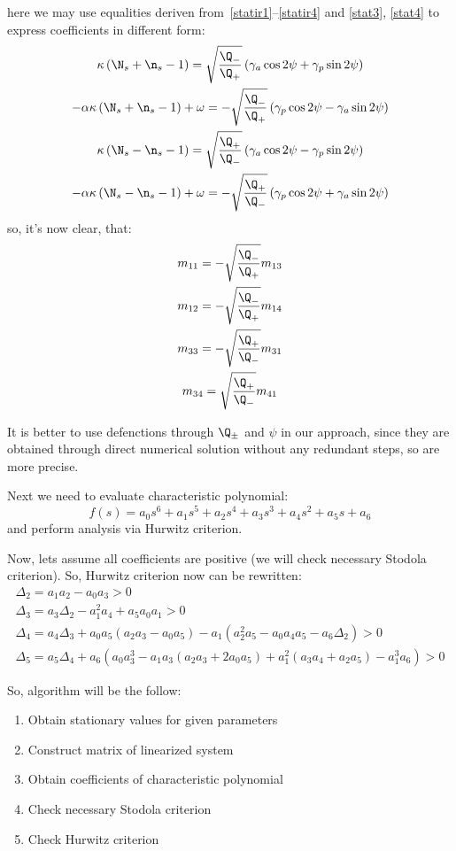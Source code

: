 \documentclass[12pt, notitlepage]{report}
\begin{document}
here we may use equalities deriven from~\eqref{statir1}--\eqref{statir4} and \eqref{stat3}, \eqref{stat4} to express coefficients in different form:
\begin{gather}
	\kappa \left(\N_s + \n_s - 1\right) = \sqrt{\frac{\Q_-}{\Q_+}} \left( \gamma_a  \cos 2\psi + \gamma_p  \sin 2\psi \right) \\
	-\alpha\kappa \left(\N_s+ \n_s - 1\right) + \omega  = -\sqrt{\frac{\Q_-}{\Q_+}} \left(\gamma_p  \cos 2\psi - \gamma_a  \sin 2\psi \right) \\
	\kappa \left(\N_s - \n_s - 1\right) = \sqrt{\frac{\Q_+}{\Q_-}} \left(\gamma_a  \cos 2\psi - \gamma_p \sin 2\psi\right) \\
	-\alpha\kappa \left(\N_s- \n_s - 1\right) + \omega  = -\sqrt{\frac{\Q_+}{\Q_-}} \left(\gamma_p \cos 2\psi + \gamma_a  \sin 2\psi\right)
\end{gather}
so, it's now clear, that:
\begin{gather*}
	m_{11} = -\sqrt{\frac{\Q_-}{\Q_+}}m_{13} \\
	m_{12} = -\sqrt{\frac{\Q_-}{\Q_+}}m_{14} \\
	m_{33} = -\sqrt{\frac{\Q_+}{\Q_-}}m_{31} \\
	m_{34} = \sqrt{\frac{\Q_+}{\Q_-}}m_{41} \\
\end{gather*}

It is better to use defenctions through $\Q_\pm$ and $\psi$ in our approach, since they are obtained through direct numerical solution without any redundant steps, so are more precise.

Next we need to evaluate characteristic polynomial:
\begin{equation}
	f(s) = a_0 s^6 + a_1 s^5 + a_2 s^4 + a_3 s^3 + a_4 s ^2 + a_5 s + a_6
\end{equation}
and perform analysis via Hurwitz criterion.

Now, lets assume all coefficients are positive (we will check necessary Stodola criterion). So, Hurwitz criterion now can be rewritten:
\begin{gather}
	\Delta_2 = a_1 a_2 - a_0 a_3 > 0 \\
	\Delta_3 = a_3\Delta_2 - a_1^2a_4 + a_5a_0a_1 > 0 \\
	\Delta_4 = a_4\Delta_3 + a_0a_5(a_2a_3-a_0a_5) -a_1(a_2^2a_5-a_0a_4a_5-a_6\Delta_2) > 0\\
	\Delta_5 = a_5\Delta_4 + a_6(a_0a_3^3-a_1a_3(a_2a_3+2a_0a_5)+a_1^2(a_3a_4+a_2a_5)-a_1^3a_6) > 0
\end{gather}

So, algorithm will be the follow:
\begin{enumerate}
	\item Obtain stationary values for given parameters
	\item Construct matrix of linearized system
	\item Obtain coefficients of characteristic polynomial
	\item Check necessary Stodola criterion
	\item Check Hurwitz criterion
\end{enumerate}
\end{document}
